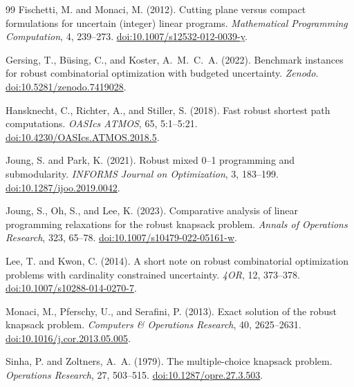 \documentclass[11pt]{article}
\theoremstyle{plain}
\theoremstyle{definition}
\theoremstyle{remark}
\begin{document}
\begin{thebibliography}{99}
Fischetti, M. and Monaci, M. (2012).
\newblock Cutting plane versus compact formulations for uncertain (integer) linear programs.
\newblock \emph{Mathematical Programming Computation}, 4, 239--273.
\newblock \href{https://doi.org/10.1007/s12532-012-0039-y}{doi:10.1007/s12532-012-0039-y}.

Gersing, T., B\"using, C., and Koster, A.~M.~C.~A. (2022).
\newblock Benchmark instances for robust combinatorial optimization with budgeted uncertainty.
\newblock \emph{Zenodo}.
\newblock \href{https://doi.org/10.5281/zenodo.7419028}{doi:10.5281/zenodo.7419028}.

Hansknecht, C., Richter, A., and Stiller, S. (2018).
\newblock Fast robust shortest path computations.
\newblock \emph{OASIcs ATMOS}, 65, 5:1--5:21.
\newblock \href{https://doi.org/10.4230/OASIcs.ATMOS.2018.5}{doi:10.4230/OASIcs.ATMOS.2018.5}.

Joung, S. and Park, K. (2021).
\newblock Robust mixed 0--1 programming and submodularity.
\newblock \emph{INFORMS Journal on Optimization}, 3, 183--199.
\newblock \href{https://doi.org/10.1287/ijoo.2019.0042}{doi:10.1287/ijoo.2019.0042}.

Joung, S., Oh, S., and Lee, K. (2023).
\newblock Comparative analysis of linear programming relaxations for the robust knapsack problem.
\newblock \emph{Annals of Operations Research}, 323, 65--78.
\newblock \href{https://doi.org/10.1007/s10479-022-05161-w}{doi:10.1007/s10479-022-05161-w}.

Lee, T. and Kwon, C. (2014).
\newblock A short note on robust combinatorial optimization problems with cardinality constrained uncertainty.
\newblock \emph{4OR}, 12, 373--378.
\newblock \href{https://doi.org/10.1007/s10288-014-0270-7}{doi:10.1007/s10288-014-0270-7}.

Monaci, M., Pferschy, U., and Serafini, P. (2013).
\newblock Exact solution of the robust knapsack problem.
\newblock \emph{Computers \& Operations Research}, 40, 2625--2631.
\newblock \href{https://doi.org/10.1016/j.cor.2013.05.005}{doi:10.1016/j.cor.2013.05.005}.

Sinha, P. and Zoltners, A.~A. (1979).
\newblock The multiple-choice knapsack problem.
\newblock \emph{Operations Research}, 27, 503--515.
\newblock \href{https://doi.org/10.1287/opre.27.3.503}{doi:10.1287/opre.27.3.503}.


\end{thebibliography}
\end{document}
